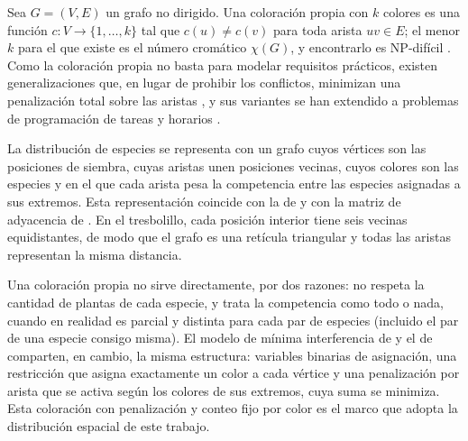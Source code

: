 Sea $G=(V,E)$ un grafo no dirigido. Una coloración propia con $k$ colores es una función $c:V\to\{1,\dots,k\}$ tal que $c(u)\neq c(v)$ para toda arista $uv\in E$; el menor $k$ para el que existe es el número cromático $\chi(G)$, y encontrarlo es NP-difícil \parencite{eisenblatter2002}. Como la coloración propia no basta para modelar requisitos prácticos, existen generalizaciones que, en lugar de prohibir los conflictos, minimizan una penalización total sobre las aristas \parencite{eisenblatter2002}, y sus variantes se han extendido a problemas de programación de tareas y horarios \parencite{dewerra2015}.

La distribución de especies se representa con un grafo cuyos vértices son las posiciones de siembra, cuyas aristas unen posiciones vecinas, cuyos colores son las especies y en el que cada arista pesa la competencia entre las especies asignadas a sus extremos. Esta representación coincide con la de \textcite{elizalde2025} y con la matriz de adyacencia de \textcite{liu2026}. En el tresbolillo, cada posición interior tiene seis vecinas equidistantes, de modo que el grafo es una retícula triangular y todas las aristas representan la misma distancia.

Una coloración propia no sirve directamente, por dos razones: no respeta la cantidad de plantas de cada especie, y trata la competencia como todo o nada, cuando en realidad es parcial y distinta para cada par de especies (incluido el par de una especie consigo misma). El modelo de mínima interferencia de \textcite{eisenblatter2002} y el de \textcite{elizalde2025} comparten, en cambio, la misma estructura: variables binarias de asignación, una restricción que asigna exactamente un color a cada vértice y una penalización por arista que se activa según los colores de sus extremos, cuya suma se minimiza. Esta coloración con penalización y conteo fijo por color es el marco que adopta la distribución espacial de este trabajo.

